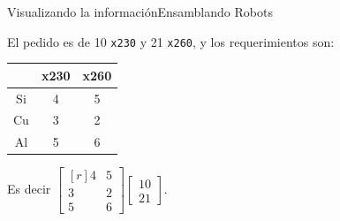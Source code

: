 \documentclass[spanish, c]{beamer}
\begin{document}
\begin{frame}{Visualizando la información}{Ensamblando Robots}

    El pedido es de 10 \texttt{x230} y 21 \texttt{x260}, y los requerimientos son:

        \begin{center}
            \begin{table}[H]
                \begin{tabular}{@{}ccc@{}}
                \toprule
                                        & x230 & x260 \\ \midrule
                \multicolumn{1}{c|}{Si} & 4    & 5    \\
                \multicolumn{1}{c|}{Cu} & 3    & 2    \\
                \multicolumn{1}{c|}{Al} & 5    & 6    \\ \bottomrule
                \end{tabular}
            \end{table}
        \end{center} \pause

    Es decir $\begin{bmatrix*}[r] 4 & 5 \\ 3 & 2 \\ 5 & 6 \end{bmatrix*} \begin{bmatrix} 10 \\ 21\end{bmatrix}$.
\end{frame}
\end{document}
